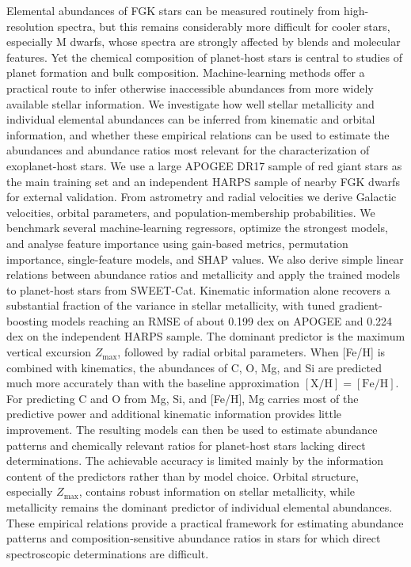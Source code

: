 \documentclass{aa}
\begin{document}
  \abstract
   {Elemental abundances of FGK stars can be measured routinely from high-resolution spectra, but this remains considerably more difficult for cooler stars, especially M dwarfs, whose spectra are strongly affected by blends and molecular features. Yet the chemical composition of planet-host stars is central to studies of planet formation and bulk composition. Machine-learning methods offer a practical route to infer otherwise inaccessible abundances from more widely available stellar information.}
   {We investigate how well stellar metallicity and individual elemental abundances can be inferred from kinematic and orbital information, and whether these empirical relations can be used to estimate the abundances and abundance ratios most relevant for the characterization of exoplanet-host stars.} 
   {We use a large APOGEE DR17 sample of red giant stars as the main training set and an independent HARPS sample of nearby FGK dwarfs for external validation. From astrometry and radial velocities we derive Galactic velocities, orbital parameters, and population-membership probabilities. We benchmark several machine-learning regressors, optimize the strongest models, and analyse feature importance using gain-based metrics, permutation importance, single-feature models, and SHAP values. We also derive simple linear relations between abundance ratios and metallicity and apply the trained models to planet-host stars from SWEET-Cat.}
   {Kinematic information alone recovers a substantial fraction of the variance in stellar metallicity, with tuned gradient-boosting models reaching an RMSE of about 0.199 dex on APOGEE and 0.224 dex on the independent HARPS sample. The dominant predictor is the maximum vertical excursion $Z_{\max}$, followed by radial orbital parameters. When [Fe/H] is combined with kinematics, the abundances of C, O, Mg, and Si are predicted much more accurately than with the baseline approximation $\mathrm{[X/H]}=\mathrm{[Fe/H]}$. For predicting C and O from Mg, Si, and [Fe/H], Mg carries most of the predictive power and additional kinematic information provides little improvement. The resulting models can then be used to estimate abundance patterns and chemically relevant ratios for planet-host stars lacking direct determinations.}
   {The achievable accuracy is limited mainly by the information content of the predictors rather than by model choice. Orbital structure, especially $Z_{\max}$, contains robust information on stellar metallicity, while metallicity remains the dominant predictor of individual elemental abundances. These empirical relations provide a practical framework for estimating abundance patterns and composition-sensitive abundance ratios in stars for which direct spectroscopic determinations are difficult.}
\end{document}
